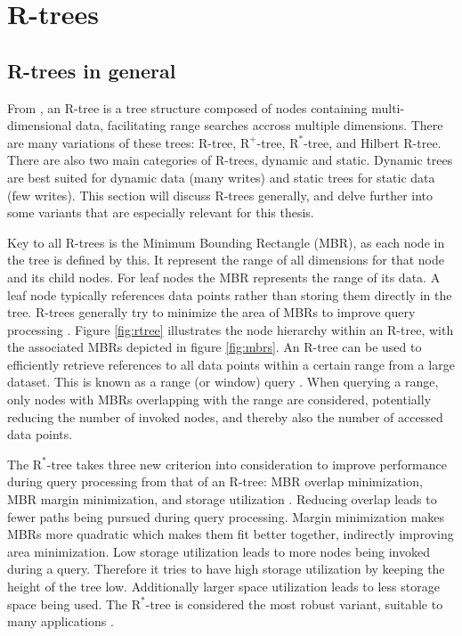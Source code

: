 \section{R-trees}
\label{sec:rtree}

\subsection{R-trees in general}
From \textcite{rtree}, an R-tree is a tree structure composed of nodes containing multi-dimensional data, facilitating range searches accross multiple dimensions. There are many variations of these trees: R-tree, $\text{R}^+$-tree, $\text{R}^*$-tree, and Hilbert R-tree. There are also two main categories of R-trees, dynamic and static. Dynamic trees are best suited for dynamic data (many writes) and static trees for static data (few writes). This section will discuss R-trees generally, and delve further into some variants that are especially relevant for this thesis.

Key to all R-trees is the Minimum Bounding Rectangle (MBR), as each node in the tree is defined by this. It represent the range of all dimensions for that node and its child nodes. For leaf nodes the MBR represents the range of its data. A leaf node typically references data points rather than storing them directly in the tree. R-trees generally try to minimize the area of MBRs to improve query processing \cite{rtree}. Figure \ref{fig:rtree} illustrates the node hierarchy within an R-tree, with the associated MBRs depicted in figure \ref{fig:mbrs}. An R-tree can be used to efficiently retrieve references to all data points within a certain range from a large dataset. This is known as a range (or window) query \cite{rtree}. When querying a range, only nodes with MBRs overlapping with the range are considered, potentially reducing the number of invoked nodes, and thereby also the number of accessed data points.

The $\text{R}^*$-tree takes three new criterion into consideration to improve performance during query processing from that of an R-tree: MBR overlap minimization, MBR margin minimization, and storage utilization \cite{rtree}. Reducing overlap leads to fewer paths being pursued during query processing. Margin minimization makes MBRs more quadratic which makes them fit better together, indirectly improving area minimization. Low storage utilization leads to more nodes being invoked during a query. Therefore it tries to have high storage utilization by keeping the height of the tree low. Additionally larger space utilization leads to less storage space being used. The $\text{R}^*$-tree is considered the most robust variant, suitable to many applications \cite{rtree}.

